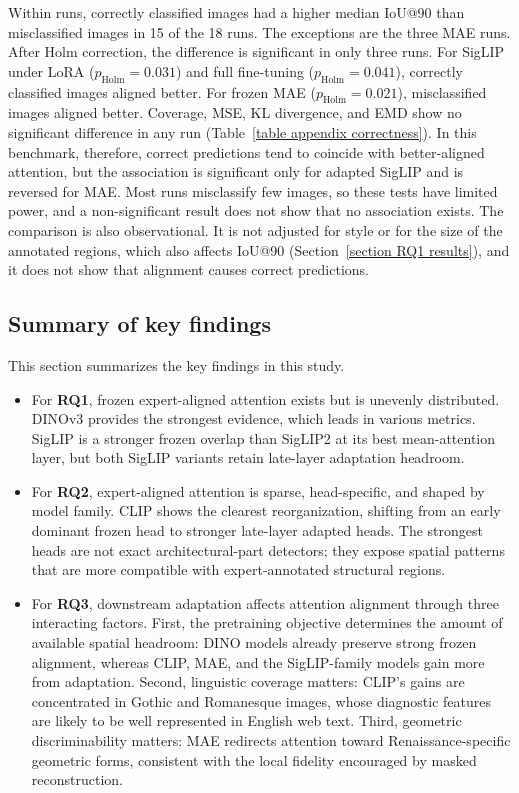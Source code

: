 \documentclass[lineno,pdflatex,sn-mathphys-num]{sn-jnl}%
\theoremstyle{thmstyleone}%
\theoremstyle{thmstyletwo}%
\theoremstyle{thmstylethree}%
\begin{document}
Within runs, correctly classified images had a higher median IoU@90 than misclassified images in 15 of the 18 runs. The exceptions are the three MAE runs. After Holm correction, the difference is significant in only three runs. For SigLIP under LoRA ($p_{\text{Holm}}=0.031$) and full fine-tuning ($p_{\text{Holm}}=0.041$), correctly classified images aligned better. For frozen MAE ($p_{\text{Holm}}=0.021$), misclassified images aligned better. Coverage, MSE, KL divergence, and EMD show no significant difference in any run (Table~\ref{table appendix correctness}). In this benchmark, therefore, correct predictions tend to coincide with better-aligned attention, but the association is significant only for adapted SigLIP and is reversed for MAE. Most runs misclassify few images, so these tests have limited power, and a non-significant result does not show that no association exists. The comparison is also observational. It is not adjusted for style or for the size of the annotated regions, which also affects IoU@90 (Section~\ref{section RQ1 results}), and it does not show that alignment causes correct predictions.

\FloatBarrier


\subsection{Summary of key findings}

This section summarizes the key findings in this study.
\begin{itemize}
\item For \textbf{RQ1}, frozen expert-aligned attention exists but is unevenly distributed. DINOv3 provides the strongest evidence, which leads in various metrics. SigLIP is a stronger frozen overlap than SigLIP2 at its best mean-attention layer, but both SigLIP variants retain late-layer adaptation headroom.
\item For \textbf{RQ2}, expert-aligned attention is sparse, head-specific, and shaped by model family. CLIP shows the clearest reorganization, shifting from an early dominant frozen head to stronger late-layer adapted heads. The strongest heads are not exact architectural-part detectors; they expose spatial patterns that are more compatible with expert-annotated structural regions.
\item For \textbf{RQ3}, downstream adaptation affects attention alignment through three interacting factors. First, the pretraining objective determines the amount of available spatial headroom: DINO models already preserve strong frozen alignment, whereas CLIP, MAE, and the SigLIP-family models gain more from adaptation. Second, linguistic coverage matters: CLIP's gains are concentrated in Gothic and Romanesque images, whose diagnostic features are likely to be well represented in English web text. Third, geometric discriminability matters: MAE redirects attention toward Renaissance-specific geometric forms, consistent with the local fidelity encouraged by masked reconstruction.
\end{itemize}
\end{document}
